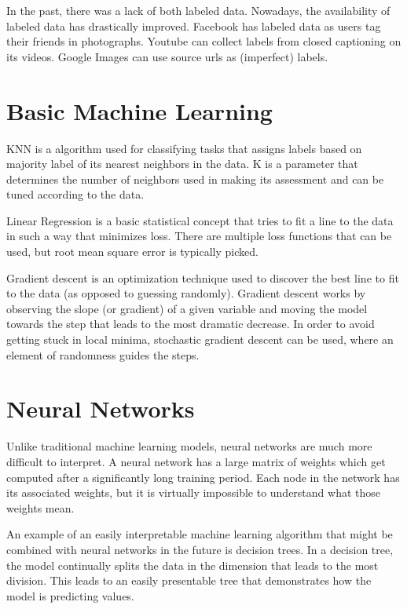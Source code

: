 \documentclass[twoside]{article}
\begin{document}
In the past, there was a lack of both labeled data. Nowadays, the availability of labeled data has drastically improved. Facebook has labeled data as users tag their friends in photographs. Youtube can collect labels from closed captioning on its videos. Google Images can use source urls as (imperfect) labels.   

\section{Basic Machine Learning}

KNN is a algorithm used for classifying tasks that assigns labels based on majority label of its nearest neighbors in the data. K is a parameter that determines the number of neighbors used in making its assessment and can be tuned according to the data. 

Linear Regression is a basic statistical concept that tries to fit a line to the data in such a way that minimizes loss. There are multiple loss functions that can be used, but root mean square error is typically picked. 

Gradient descent is an optimization technique used to discover the best line to fit to the data (as opposed to guessing randomly). Gradient descent works by observing the slope (or gradient) of a given variable and moving the model towards the step that leads to the most dramatic decrease. In order to avoid getting stuck in local minima, stochastic gradient descent can be used, where an element of randomness guides the steps.

\section{Neural Networks}

Unlike traditional machine learning models, neural networks are much more difficult to interpret. A neural network has a large matrix of weights which get computed after a significantly long training period. Each node in the network has its associated weights, but it is virtually impossible to understand what those weights mean.

An example of an easily interpretable machine learning algorithm that might be combined with neural networks in the future is decision trees. In a decision tree, the model continually splits the data in the dimension that leads to the most division. This leads to an easily presentable tree that demonstrates how the model is predicting values.
\end{document}
